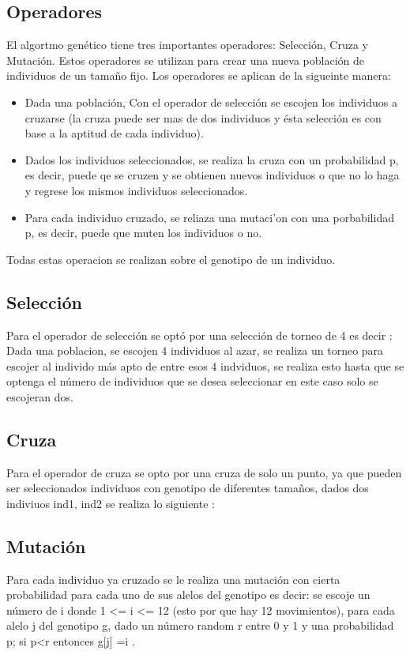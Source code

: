 \documentclass[oneside,10pt]{article}
\begin{document}
\subsection{Operadores}
El algortmo gen\'etico tiene tres importantes operadores: Selecci\'on, Cruza y Mutaci\'on. Estos operadores se utilizan para crear una nueva poblaci\'on de individuos de un tama\~no fijo. Los operadores se aplican de la sigueinte manera:
\begin{itemize}
    \item Dada una poblaci\'on, Con el operador de selecci\'on se escojen los individuos a cruzarse (la cruza puede ser mas de dos individuos y \'esta selecci\'on es con base a la aptitud de cada individuo).  
    \item Dados los individuos seleccionados, se realiza la cruza con un probabilidad p, es decir, puede qe se cruzen y se obtienen nuevos individuos o que no lo haga y regrese los mismos individuos seleccionados. 
    \item Para cada individuo cruzado, se reliaza una mutaci'on con una porbabilidad p, es decir, puede que muten los individuos o no.  
        
\end{itemize}
Todas estas operacion se realizan sobre el genotipo de un individuo.
\subsection{Selecci\'on}
Para el operador de selecci\'on se opt\'o por una selecci\'on de torneo de 4 es decir :\\
Dada una poblacion, se escojen 4 individuos al azar, se realiza un torneo para escojer al individo m\'as apto de entre esos 4 indviduos, se realiza esto hasta que se optenga el n\'umero de individuos que se desea seleccionar en este caso solo se escojeran dos.

\subsection{Cruza}
Para el operador de cruza se opto por una cruza de solo un punto, ya que pueden ser seleccionados individuos con genotipo de diferentes tama\~nos, dados dos indiviuos ind1, ind2 se realiza lo siguiente :

\subsection{Mutaci\'on}
Para cada individuo ya cruzado se le realiza una mutaci\'on con cierta probabilidad para cada uno de sus alelos del genotipo es decir: se escoje un n\'umero de i donde 1 <= i <= 12 (esto por que hay 12 movimientos), para cada alelo j del genotipo g, dado un n\'umero random r entre 0 y 1 y una probabilidad p; si p<r entonces g[j] =i .
\end{document}
